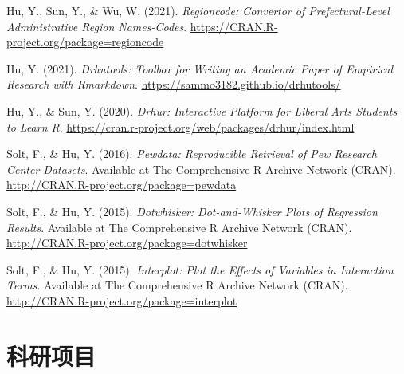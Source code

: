 \documentclass[11pt,a4paper,]{awesome-cv}
\begin{document}
\leavevmode{}%
Hu, Y., Sun, Y., \& Wu, W. (2021). \emph{Regioncode: Convertor of
Prefectural-Level Administrative Region Names-Codes}.
\url{https://CRAN.R-project.org/package=regioncode}

\leavevmode{}%
Hu, Y. (2021). \emph{Drhutools: Toolbox for Writing an Academic Paper of
Empirical Research with Rmarkdown}.
\url{https://sammo3182.github.io/drhutools/}

\leavevmode{}%
Hu, Y., \& Sun, Y. (2020). \emph{Drhur: Interactive Platform for Liberal
Arts Students to Learn R}.
\url{https://cran.r-project.org/web/packages/drhur/index.html}

\leavevmode{}%
Solt, F., \& Hu, Y. (2016). \emph{Pewdata: Reproducible Retrieval of Pew
Research Center Datasets}. Available at The Comprehensive R Archive
Network (CRAN). \url{http://CRAN.R-project.org/package=pewdata}

\leavevmode{}%
Solt, F., \& Hu, Y. (2015). \emph{Dotwhisker: Dot-and-Whisker Plots of
Regression Results}. Available at The Comprehensive R Archive Network
(CRAN). \url{http://CRAN.R-project.org/package=dotwhisker}

\leavevmode{}%
Solt, F., \& Hu, Y. (2015). \emph{Interplot: Plot the Effects of
Variables in Interaction Terms}. Available at The Comprehensive R
Archive Network (CRAN).
\url{http://CRAN.R-project.org/package=interplot}

\endgroup

\hypertarget{ux79d1ux7814ux9879ux76ee}{%
\section{科研项目}\label{ux79d1ux7814ux9879ux76ee}}

\begin{cventries}
    \vspace{-4.0mm}
    \vspace{-4.0mm}
    \vspace{-4.0mm}
    \vspace{-4.0mm}
\end{cventries}
\end{document}
